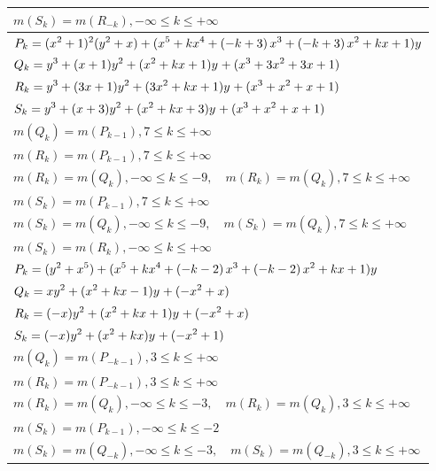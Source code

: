 \documentclass{amsart}
\begin{document}
\begin{longtable}{|l|}
\(\displaystyle m(S_k) = m(R_{-k}),-\infty \leqslant k \leqslant +\infty\)\\
\hline
\(\displaystyle P_k=(x^2
 + 1)^{2}(y^2+x)+(x^5
 + k\*x^4
 + \left(-k
 + 3\right) \*x^3
 + \left(-k
 + 3\right) \*x^2
 + k\*x
 + 1)y\)\\
\(\displaystyle Q_k=y^{3}+(x
 + 1)y^{2}+(x^2
 + k\*x
 + 1)y^{}+(x^3
 + 3\*x^2
 + 3\*x
 + 1)\)\\
\(\displaystyle R_k=y^{3}+(3\*x
 + 1)y^{2}+(3\*x^2
 + k\*x
 + 1)y^{}+(x^3
 + x^2
 + x
 + 1)\)\\
\(\displaystyle S_k=y^{3}+(x
 + 3)y^{2}+(x^2
 + k\*x
 + 3)y^{}+(x^3
 + x^2
 + x
 + 1)\)\\
\(\displaystyle m(Q_k) = m(P_{k
 - 1}),7 \leqslant k \leqslant +\infty\)\\
\(\displaystyle m(R_k) = m(P_{k
 - 1}),7 \leqslant k \leqslant +\infty\)\\
\(\displaystyle m(R_k) = m(Q_{k}),-\infty \leqslant k \leqslant -9,\quad m(R_k) = m(Q_{k}),7 \leqslant k \leqslant +\infty\)\\
\(\displaystyle m(S_k) = m(P_{k
 - 1}),7 \leqslant k \leqslant +\infty\)\\
\(\displaystyle m(S_k) = m(Q_{k}),-\infty \leqslant k \leqslant -9,\quad m(S_k) = m(Q_{k}),7 \leqslant k \leqslant +\infty\)\\
\(\displaystyle m(S_k) = m(R_{k}),-\infty \leqslant k \leqslant +\infty\)\\
\hline
\(\displaystyle P_k=(y^2+x^5)+(x^5
 + k\*x^4
 + \left(-k
 - 2\right) \*x^3
 + \left(-k
 - 2\right) \*x^2
 + k\*x
 + 1)y\)\\
\(\displaystyle Q_k=xy^{2}+(x^2
 + k\*x
 - 1)y^{}+(-x^2
 + x)\)\\
\(\displaystyle R_k=(-x)y^{2}+(x^2
 + k\*x
 + 1)y^{}+(-x^2
 + x)\)\\
\(\displaystyle S_k=(-x)y^{2}+(x^2
 + k\*x)y^{}+(-x^2
 + 1)\)\\
\(\displaystyle m(Q_k) = m(P_{-k
 - 1}),3 \leqslant k \leqslant +\infty\)\\
\(\displaystyle m(R_k) = m(P_{-k
 - 1}),3 \leqslant k \leqslant +\infty\)\\
\(\displaystyle m(R_k) = m(Q_{k}),-\infty \leqslant k \leqslant -3,\quad m(R_k) = m(Q_{k}),3 \leqslant k \leqslant +\infty\)\\
\(\displaystyle m(S_k) = m(P_{k
 - 1}),-\infty \leqslant k \leqslant -2\)\\
\(\displaystyle m(S_k) = m(Q_{-k}),-\infty \leqslant k \leqslant -3,\quad m(S_k) = m(Q_{-k}),3 \leqslant k \leqslant +\infty\)\\

\end{longtable}
\end{document}
